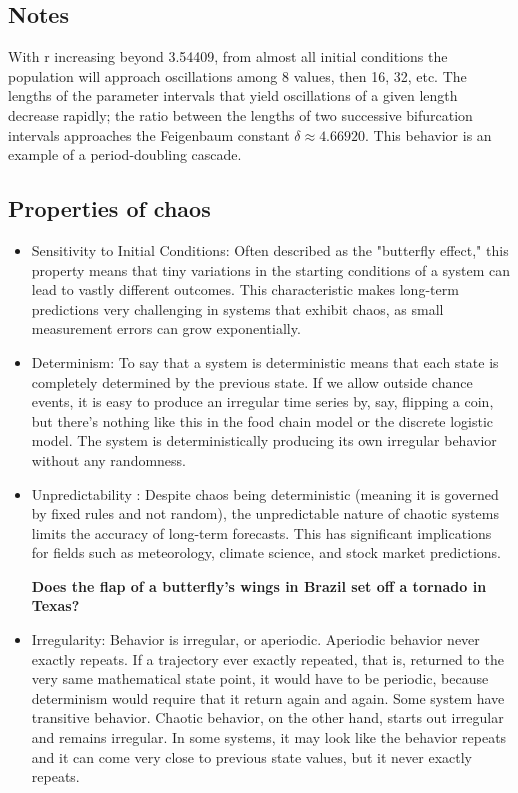 \documentclass[12pt,a4paper]{article}
\begin{document}
\subsection{Notes}
With r increasing beyond 3.54409, from almost all initial conditions the population will approach oscillations among 8 values, then 16, 32, etc. The lengths of the parameter intervals that yield oscillations of a given length decrease rapidly; the ratio between the lengths of two successive bifurcation intervals approaches the Feigenbaum constant $\delta \approx 4.66920$. This behavior is an example of a period-doubling cascade.

\subsection{Properties of chaos}
\begin{itemize}
    \item Sensitivity to Initial Conditions: Often described as the "butterfly effect," this property means that tiny variations in the starting conditions of a system can lead to vastly different outcomes. This characteristic makes long-term predictions very challenging in systems that exhibit chaos, as small measurement errors can grow exponentially.
    \item Determinism: To say that a system is deterministic means that each state is completely determined by the previous state. If we allow outside chance events, it is easy to produce an irregular time series by, say, flipping
a coin, but there’s nothing like this in the food chain model or the discrete logistic model. The
system is deterministically producing its own irregular behavior without any randomness.
\item Unpredictability : Despite chaos being deterministic (meaning it is governed by fixed rules and not random), the unpredictable nature of chaotic systems limits the accuracy of long-term forecasts. This has significant implications for fields such as meteorology, climate science, and stock market predictions.

\textbf{Does the flap of a butterfly’s wings in Brazil set off a tornado in Texas?}

\item Irregularity: Behavior is irregular, or aperiodic. Aperiodic behavior never exactly repeats. If a trajectory ever exactly repeated, that is, returned to the very same mathematical state point, it would have to
be periodic, because determinism would require that it return again and again. Some system have transitive behavior. Chaotic behavior, on the other hand, starts out irregular and remains irregular.  In some systems, it may look like the behavior repeats and it can come very close to previous state values, but it never exactly repeats.

\end{itemize}
\end{document}
